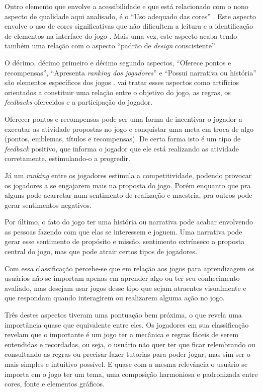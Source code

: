 Outro elemento que envolve a acessibilidade e que está relacionado com o nono aspecto de qualidade aqui analisado, é o ``Uso adequado das cores'' \cite{Petri_Wangenheim_2019}. Este aspecto envolve o uso de cores significativas que não dificultem a leitura e a identificação de elementos na interface do jogo \cite{silva_sales_mendes2021}. Mais uma vez, este aspecto acaba tendo também uma relação com o aspecto ``padrão de \textit{design} conscistente'' \cite{Petri_Wangenheim_2019} 

O décimo, décimo primeiro e décimo segundo aspectos, ``Oferece pontos e recompensas'', ``Apresenta \textit{ranking dos jogadores}'' e ``Possui narrativa ou história'' são elementos específicos dos jogos \cite{silva_sales_mendes2021}.  vai tratar esses aspectos como artifícios orientados a constituir uma relação entre o objetivo do jogo, as regras, os \textit{feedbacks} oferecidos e a participação do jogador.

Oferecer pontos e recompensas pode ser uma forma de incentivar o jogador a executar as atividade propostas no jogo e conquistar uma meta em troca de algo (pontos, emblemas, títulos e recompensas). De certa forma isto é um tipo de \textit{feedback} positivo, que informa o jogador que ele está realizando as atividade corretamente, estimulando-o a progredir.

Já um \textit{ranking} entre os jogadores estimula a competitividade, podendo provocar os jogadores a se engajarem mais na proposta do jogo. Porém enquanto que pra alguns pode acarretar num sentimento de realização e maestria, pra outros pode gerar sentimentos negativos.

Por último, o fato do jogo ter uma história ou narrativa pode acabar envolvendo as pessoas fazendo com que elas se interessem e joguem. Uma narrativa pode gerar esse sentimento de propósito e missão, sentimento extrínseco a proposta central do jogo, mas que pode atrair certos tipos de jogadores. 

Com essa classificação percebe-se que em relação aos jogos para aprendizagem os usuários não se importam apenas em aprender algo ou ter seu conhecimento avaliado, mas desejam usar jogos desse tipo que sejam atraentes visualmente e que respondam quando interagirem ou realizarem alguma ação no jogo.

Três destes aspectos tiveram uma pontuação bem próxima, o que revela uma importância quase que equivalente entre eles. Os jogadores em sua classificação revelam que o importante é um jogo ter a mecânica e regras fáceis de serem entendidas e recordadas, ou seja, o usuário não quer ter que ficar relembrando ou consultando as regras ou precisar fazer tutorias para poder jogar, mas sim ser o mais simples e intuitivo possível. E quase com a mesma relevância o usuário se importa em o jogo ter um tema, uma composição harmoniosa e padronizada entre cores, fonte e elementos gráficos.

